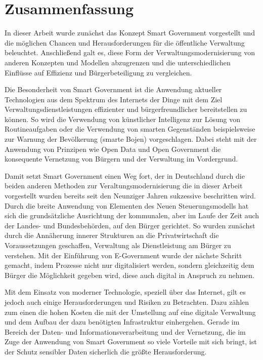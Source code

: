 \section{Zusammenfassung}
In dieser Arbeit wurde zunächst das Konzept Smart Government vorgestellt und die möglichen Chancen und Herausforderungen für die öffentliche Verwaltung beleuchtet.
Anschließend galt es, diese Form der Verwaltungsmodernisierung von anderen Konzepten und Modellen abzugrenzen und die unterschiedlichen Einflüsse auf Effizienz und Bürgerbeteiligung zu vergleichen.

Die Besonderheit von Smart Government ist die Anwendung aktueller Technologien aus dem Spektrum des Internets der Dinge mit dem Ziel Verwaltungsdienstleistungen effizienter und bürgerfreundlicher bereitstellen zu können.
So wird die Verwendung von künstlicher Intelligenz zur Lösung von Routineaufgaben oder die Verwendung von smarten Gegenständen beispielsweise zur Warnung der Bevölkerung (smarte Bojen) vorgeschlagen.
Dabei steht mit der Anwendung von Prinzipen wie Open Data und Open Government die konsequente Vernetzung von Bürgern und der Verwaltung im Vordergrund.

Damit setzt Smart Government einen Weg fort, der in Deutschland durch die beiden anderen Methoden zur Veraltungsmodernisierung die in dieser Arbeit vorgestellt wurden bereits seit den Neunziger Jahren sukzessive beschritten wird.
Durch die breite Anwendung von Elementen des Neuen Steuerungsmodells hat sich die grundsätzliche Ausrichtung der kommunalen, aber im Laufe der Zeit auch der Landes- und Bundesbehörden, auf den Bürger gerichtet.
So wurden zunächst durch die Annäherung innerer Strukturen an die Privatwirtschaft die Voraussetzungen geschaffen, Verwaltung als Dienstleistung am Bürger zu verstehen.
Mit der Einführung von E-Government wurde der nächste Schritt gemacht, indem Prozesse nicht nur digitalisiert werden, sondern gleichzeitig dem Bürger die Möglichkeit gegeben wird, diese auch digital in Anspruch zu nehmen.

Mit dem Einsatz von moderner Technologie, speziell über das Internet, gilt es jedoch auch einige Herausforderungen und Risiken zu Betrachten.
Dazu zählen zum einen die hohen Kosten die mit der Umstellung auf eine digitale Verwaltung und dem Aufbau der dazu benötigten Infrastruktur einhergehen.
Gerade im Bereich der Daten- und Informationsverarbeitung und der Vernetzung, die im Zuge der Anwendung von Smart Government so viele Vorteile mit sich bringt, ist der Schutz sensibler Daten sicherlich die größte Herausforderung.

